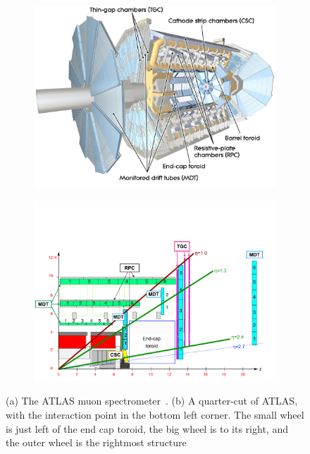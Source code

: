 \begin{figure}
\centering
\begin{subfigure}{.5\textwidth}
  \centering
  \includegraphics[width=\linewidth]{figures/atlas_muon_spectrometer.jpg}
  \label{fig:atlas_muon_spectrometer_3D}
  \caption{}
\end{subfigure}%
\begin{subfigure}{.5\textwidth}
  \centering
  \includegraphics[width=\linewidth]{figures/atlas_old_muon_spec_quarter_cut.png}
  \label{fig:atlas_muon_spectrometer_cut}
  \caption{}
\end{subfigure}
\caption{(a) The ATLAS muon spectrometer~\cite{collaboration_atlas_2008}. (b) A quarter-cut of ATLAS, with the interaction point in the bottom left corner. The small wheel is just left of the end cap toroid, the big wheel is to its right, and the outer wheel is the rightmost structure~\cite{atlas_performance_muon_trigger_2015}}
\label{fig:atlas_muon_spectrometer}
\end{figure}

